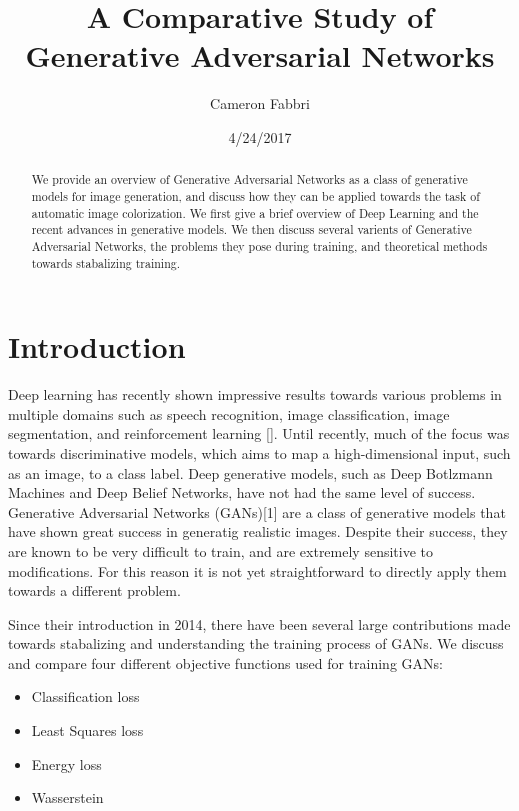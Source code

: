 \documentclass{article}
\begin{document}
\title{A Comparative Study of Generative Adversarial Networks}

\author{Cameron Fabbri}
\date{4/24/2017}

\maketitle

\begin{abstract}
We provide an overview of Generative Adversarial Networks as a class of generative models for
image generation, and discuss how they can be applied towards the task of automatic image colorization. 
We first give a brief overview of Deep Learning and the recent advances in generative models.
We then discuss several varients of Generative Adversarial Networks, the problems they pose during training,
and theoretical methods towards stabalizing training.
\end{abstract}


\section{Introduction}
Deep learning has recently shown impressive results towards various problems in multiple domains such as speech recognition,
image classification, image segmentation, and reinforcement learning []. Until recently, much of the focus was towards
discriminative models, which aims to map a high-dimensional input, such as an image, to a class label. Deep generative models,
such as Deep Botlzmann Machines and Deep Belief Networks, have not had the same level of success.
Generative Adversarial Networks (GANs)[1] are a class of generative models that have shown great success in generatig realistic
images. Despite their success, they are known to be very difficult to train, and are extremely sensitive to modifications.
For this reason it is not yet straightforward to directly apply them towards a different problem.\newline

\noindent Since their introduction in 2014, there have been several large contributions made towards stabalizing and understanding
the training process of GANs. We discuss and compare four different objective functions used for training GANs:

\begin{itemize}
   \item Classification loss
   \item Least Squares loss
   \item Energy loss
   \item Wasserstein
\end{itemize}
\end{document}
